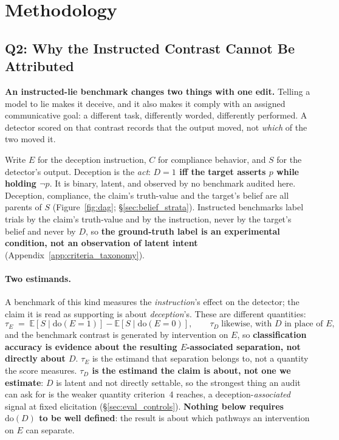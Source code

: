 \section{Methodology}
\label{sec:methodology}

\subsection{Q2: Why the Instructed Contrast Cannot Be Attributed}
\label{sec:identification}


\textbf{An instructed-lie benchmark changes two things with one edit.} Telling a model to lie makes it deceive, and it also makes it comply with an assigned communicative goal: a different task, differently worded, differently performed. A detector scored on that contrast records that the output moved, not \emph{which} of the two moved it.

Write $E$ for the deception instruction, $C$ for compliance behavior, and $S$ for the detector's output. Deception is the \emph{act}: \textbf{$D\!=\!1$ iff the target asserts $p$ while holding $\neg p$}. It is binary, latent, and observed by no benchmark audited here. Deception, compliance, the claim's truth-value and the target's belief are all parents of $S$ (Figure~\ref{fig:dag}; §\ref{sec:belief_strata}). Instructed benchmarks label trials by the claim's truth-value and by the instruction, never by the target's belief and never by $D$, so \textbf{the ground-truth label is an experimental condition, not an observation of latent intent} (Appendix~\ref{app:criteria_taxonomy}).

\paragraph{Two estimands.} A benchmark of this kind measures the \emph{instruction}'s effect on the detector; the claim it is read as supporting is about \emph{deception}'s. These are different quantities:
\begin{equation*}
\tau_E \;=\; \mathbb{E}[S \mid \mathrm{do}(E{=}1)] - \mathbb{E}[S \mid \mathrm{do}(E{=}0)],
\qquad \tau_D \;\text{likewise, with } D \text{ in place of } E,
\end{equation*}
and the benchmark contrast is generated by intervention on $E$, so \textbf{classification accuracy is evidence about the resulting $E$-associated separation, not directly about $D$}. $\tau_E$ is the estimand that separation belongs to, not a quantity the score measures. \textbf{$\tau_D$ is the estimand the claim is about, not one we estimate}: $D$ is latent and not directly settable, so the strongest thing an audit can ask for is the weaker quantity criterion~4 reaches, a deception-\emph{associated} signal at fixed elicitation (§\ref{sec:eval_controls}). \textbf{Nothing below requires $\mathrm{do}(D)$ to be well defined}: the result is about which pathways an intervention on $E$ can separate.

